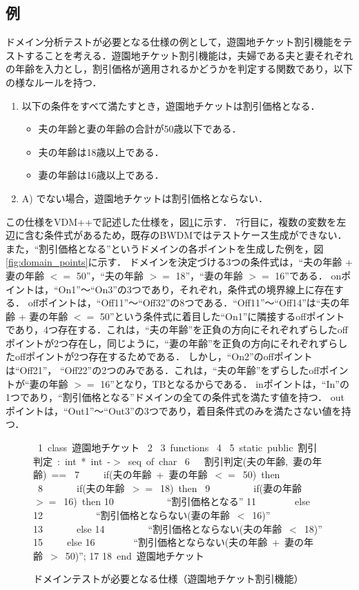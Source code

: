 \documentclass[uplatex, report, a4j, 10pt]{jsbook}
\begin{document}
\subsection{例}
ドメイン分析テストが必要となる仕様の例として，遊園地チケット割引機能をテストすることを考える．遊園地チケット割引機能は，夫婦である夫と妻それぞれの年齢を入力とし，割引価格が適用されるかどうかを判定する関数であり，以下の様なルールを持つ．
\begin{enumerate}
  \renewcommand{\labelenumi}{\Alph{enumi})}
  \item\label{enu:yuenchi} 以下の条件をすべて満たすとき，遊園地チケットは割引価格となる．
        \begin{itemize}
          \item 夫の年齢と妻の年齢の合計が50歳以下である．
          \item 夫の年齢は18歳以上である．
          \item 妻の年齢は16歳以上である．
        \end{itemize}
  \item A) でない場合，遊園地チケットは割引価格とならない．
\end{enumerate}
この仕様をVDM++で記述した仕様を，図\ref{fig:vdm_park}に示す．
7行目に，複数の変数を左辺に含む条件式があるため，既存のBWDMではテストケース生成ができない．
また，“割引価格となる”というドメインの各ポイントを生成した例を，図\ref{fig:domain_points}に示す．
ドメインを決定づける3つの条件式は，“夫の年齢 + 妻の年齢 $<=$ 50”，“夫の年齢 $>=$ 18”，“妻の年齢 $>=$ 16”である．
onポイントは，“On1”〜“On3”の3つであり，それぞれ，条件式の境界線上に存在する．
offポイントは，“Off11”〜“Off32”の8つである．“Off11”〜“Off14”は“夫の年齢 + 妻の年齢 $<=$ 50”という条件式に着目した“On1”に隣接するoffポイントであり，4つ存在する．これは，“夫の年齢”を正負の方向にそれぞれずらしたoffポイントが2つ存在し，同じように，“妻の年齢”を正負の方向にそれぞれずらしたoffポイントが2つ存在するためである．
しかし，“On2”のoffポイントは“Off21”， “Off22”の2つのみである．これは，“夫の年齢”をずらしたoffポイントが“妻の年齢 $>=$ 16”となり，TBとなるからである．
inポイントは，“In”の1つであり，“割引価格となる”ドメインの全ての条件式を満たす値を持つ．
outポイントは，“Out1”〜“Out3”の3つであり，着目条件式のみを満たさない値を持つ．

\begin{figure}[tb]
  \vbox{
    \hbox{ 1 class 遊園地チケット}
    \hbox{ 2}
    \hbox{ 3 functions}
    \hbox{ 4}
    \hbox{ 5 static public 割引判定 : int * int -$>$ seq of char}
    \hbox{ 6 \ \ 割引判定(夫の年齢, 妻の年齢) ==}
    \hbox{ 7 \ \ \ \ if(夫の年齢 + 妻の年齢 $<=$ 50) then}
    \hbox{ 8 \ \ \ \ \ \ if(夫の年齢 $>=$ 18) then}
    \hbox{ 9 \ \ \ \ \ \ \ \ if(妻の年齢 $>=$ 16) then}
    \hbox{10 \ \ \ \ \ \ \ \ \ \ ``割引価格となる''}
    \hbox{11 \ \ \ \ \ \ \ else}
    \hbox{12 \ \ \ \ \ \ \ \ \ \ ``割引価格とならない(妻の年齢 $<$ 16)''}
    \hbox{13 \ \ \ \ \ \ else}
    \hbox{14 \ \ \ \ \ \ \ \ ``割引価格とならない(夫の年齢 $<$ 18)''}
    \hbox{15 \ \ \ \ else}
    \hbox{16 \ \ \ \ \ \  \  ``割引価格とならない(夫の年齢 + 妻の年齢 $>$ 50)'';}
    \hbox{17}
    \hbox{18 end 遊園地チケット}
  }
  \centerline{}
  \caption{ドメインテストが必要となる仕様（遊園地チケット割引機能）}
  \label{fig:vdm_park}
\end{figure}
\end{document}
